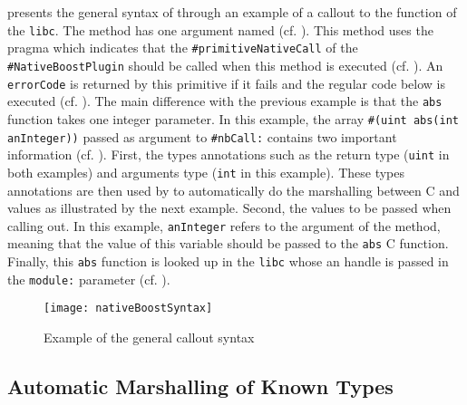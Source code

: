  presents the general syntax of \NBFFI through an example of a callout to the  function of the \texttt{libc}.
The  method has one argument named  (cf. ).
This method uses the pragma  which indicates that the \texttt{\#primitiveNativeCall} of the \texttt{\#NativeBoostPlugin} should be called when this method is executed (cf. ).
An \texttt{errorCode} is returned by this primitive if it fails and the regular \ST code below is executed (cf. ).
The main difference with the previous example is that the \texttt{abs} function takes one integer parameter.
In this example, the array \texttt{\#(uint abs(int anInteger))} passed as argument to \texttt{\#nbCall:} contains two important information (cf. ).
First, the types annotations such as the return type (\texttt{uint} in both examples) and arguments type (\texttt{int} in this example).
These types annotations are then used by \NBFFI to automatically do the marshalling between C and \PH values as illustrated by the next example.
Second, the values to be passed when calling out.
In this example, \texttt{anInteger} refers to the argument of the  method, meaning that the value of this variable should be passed to the \texttt{abs} C function.
Finally, this \texttt{abs} function is looked up in the \texttt{libc} whose an handle is passed in the \texttt{module:} parameter (cf. ).
%
%
\begin{figure}[H]
	\centering
	\texttt{[image: nativeBoostSyntax]}
	\caption[\NB Basic Method]{Example of the general \NBFFI callout syntax}
\end{figure}

\subsection{Automatic Marshalling of Known Types}

